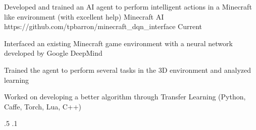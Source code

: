 \begin{cventries}

\vspace{-2.25em}
\myProject
{Developed and trained an AI agent to perform intelligent actions in a Minecraft like environment (with excellent help)} %
{Minecraft AI} %
{https://github.com/tpbarron/minecraft\_dqn\_interface} %
{Current} %
{ %
\begin{cvitems}
\item {Interfaced an existing Minecraft game environment with a neural network developed by Google DeepMind}
\item {Trained the agent to perform several tasks in the 3D environment and analyzed learning}
\item {Worked on developing a better algorithm through Transfer Learning (Python, Caffe, Torch, Lua, C++)}
\end{cvitems}
}
{.5}
{.1}



\end{cventries}
